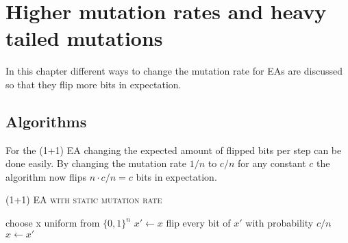 \chapter{Higher mutation rates and heavy tailed mutations}\label{ch:heavyMut}

In this chapter different ways to change the mutation rate for EAs are discussed so that they flip more bits in expectation.

\section{Algorithms}
For the (1+1) EA changing the expected amount of flipped bits per step can be done easily.
By changing the mutation rate $1/n$ to $c/n$ for any constant $c$ the algorithm now flips $n\cdot c/n=c$ bits in expectation.
\begin{algorithm}[bt]
      \caption{\textsc{(1+1) EA with static mutation rate}}\label{alg:EA_SM}

      \DontPrintSemicolon %

      \BlankLine
      choose x uniform from ${\{0,1\}}^n$\;
      {
      $x' \leftarrow x$\;
      flip every bit of $x'$ with probability $c/n$\;
      {
      {
            $x \leftarrow x'$\;
      }
      }
      }
\end{algorithm}

